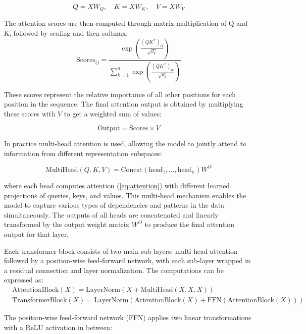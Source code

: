 \begin{equation}
    Q = XW_Q, \quad K = XW_K, \quad V = XW_V
\end{equation}


The attention scores are then computed through matrix multiplication of Q and K, followed by scaling and then softmax:
\begin{equation}
    \text{Scores}_{ij} = \frac{\exp\left(\frac{(QK^\top)_{ij}}{\sqrt{d_k}}\right)}{\sum_{k=1}^n \exp\left(\frac{(QK^\top)_{ik}}{\sqrt{d_k}}\right)}
\end{equation}

These scores represent the relative importance of all other positions for each position in the sequence. The final attention output is obtained by multiplying these scores with $V$ to get a weighted sum of values:

\begin{equation}
\text{Output} = \text{Scores} \times V
\end{equation}

In practice multi-head attention is used, allowing the model to jointly attend to information from different representation subspaces:

\begin{equation}
\text{MultiHead}(Q, K, V) = \text{Concat}(\text{head}_1, \ldots, \text{head}_h)W^O
\end{equation}

where each head computes attention (\ref{eq:attention}) with different learned projections of queries, keys, and values. This multi-head mechanism enables the model to capture various types of dependencies and patterns in the data simultaneously. The outputs of all heads are concatenated and linearly transformed by the output weight matrix $W^O$ to produce the final attention output for that layer.

Each transformer block consists of two main sub-layers: multi-head attention followed by a position-wise feed-forward network, with each sub-layer wrapped in a residual connection and layer normalization. The computations can be expressed as:
\begin{align}
& \text{AttentionBlock}(X) = \text{LayerNorm}(X + \text{MultiHead}(X, X, X)) \\
& \text{TransformerBlock}(X) = \text{LayerNorm}(\text{AttentionBlock}(X) + \text{FFN}(\text{AttentionBlock}(X)))
\end{align}

The position-wise feed-forward network (FFN) applies two linear transformations with a ReLU activation in between:


